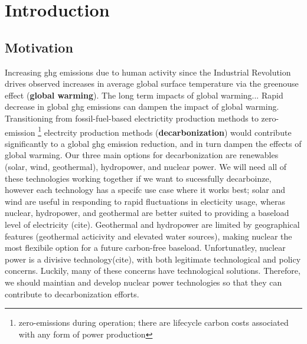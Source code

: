 \chapter{Introduction}%
\label{cha:introduction}

\section{Motivation}%
\label{sec:motivation}

Increasing \Gls{ghg} emissions due to human activity since the Industrial Revolution drives observed increases in average global surface temperature via the greenouse effect\cite{mitchell_greenhouse_1989} \cite{paola_a_arias_2021_ts} (\textbf{global warming}).
The long term impacts of global warming...
Rapid decrease in global \Gls{ghg} emissions can dampen the impact of global warming. Transitioning from fossil-fuel-based electrictity production methods to zero-emission \footnote{zero-emissions during operation; there are lifecycle carbon costs associated with any form of power production} electrcity production methods (\textbf{decarbonization}) would contribute significantly to a global \Gls{ghg} emission reduction, and in turn dampen the effects of global
warming. Our three main options for decarbonization are renewables (solar, wind, geothermal), hydropower, and nuclear power. We will need all of these technologies working together if we want to sucessfully decarboinze, however each technology has a specifc use case where it works best; solar and wind are useful in responding to rapid fluctuations in electicity usage, wheras nuclear, hydropower, and geothermal are better suited to
providing a baseload level of electricity (cite). Geothermal and hydropower are limited by geographical features (geothermal acticivity and elevated water sources), making nuclear the most flexibile option for a future carbon-free baseload. Unfortunatley, nuclear power is a divisive technology(cite), with both legitimate technological and policy concerns.%
Luckily, many of these concerns have technological solutions. Therefore, we should maintian and develop nuclear power technologies so that they can contribute to decarbonization efforts.

